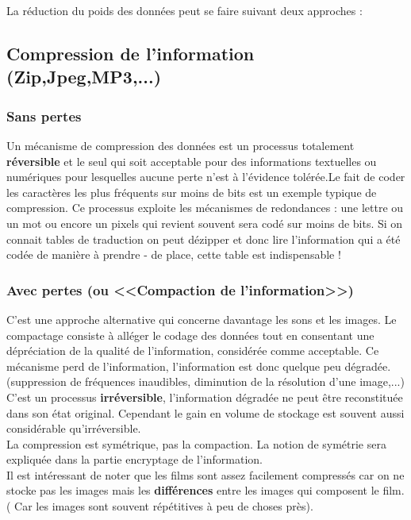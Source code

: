 \documentclass{report}
\begin{document}
La réduction du poids des données peut se faire suivant deux approches :\\

\subsection{Compression de l'information (Zip,Jpeg,MP3,...)} 
\subsubsection{Sans pertes}
Un mécanisme de compression des données est un processus totalement {\bf réversible} et le seul qui soit acceptable pour des informations textuelles ou numériques pour lesquelles aucune perte n'est à l'évidence tolérée.Le fait de coder les caractères les plus fréquents sur moins de bits est un exemple typique de compression. Ce processus exploite les mécanismes de redondances : une lettre ou un mot ou encore un pixels qui revient souvent sera codé sur moins de bits. Si on connait tables de traduction on peut dézipper et donc lire l'information qui a été codée de manière à prendre - de place, cette table est indispensable !

\subsubsection{Avec pertes (ou <<Compaction de l'information>>)}

C'est une approche alternative qui concerne davantage les sons et les images. Le compactage consiste à alléger le codage des données tout en consentant une dépréciation de la qualité de l'information, considérée comme acceptable.
Ce mécanisme perd de l'information, l'information est donc quelque peu dégradée. (suppression de fréquences inaudibles, diminution de la résolution d'une image,...) C'est un processus {\bf irréversible}, l'information dégradée ne peut être reconstituée dans son état original. Cependant le gain en volume de stockage est souvent aussi considérable qu'irréversible.\\
La compression est symétrique, pas la compaction. La notion de symétrie sera expliquée dans la partie encryptage de l'information.\\


Il est intéressant de noter que les films sont assez facilement compressés car on ne stocke pas les images mais les {\bf différences} entre les images qui composent le film. ( Car les images sont souvent répétitives à peu de choses près).\\
\end{document}
